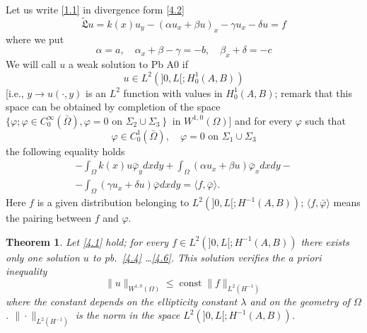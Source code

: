 \documentclass[a4paper,12pt,leqno]{article}
\newtheorem{theorem}[proposition]{Theorem}
\numberwithin{equation}{section}
\begin{document}
Let us write \cref{1.1} in divergence form \eqref{4.2}
\begin{equation} \label{4.2}
	\tilde{\mathfrak{L}} u=k(x) u_{y}-\left(\alpha u_{x}+\beta u\right)_{x}-\gamma u_{x}-\delta {u}=f
\end{equation}
where we put
\begin{equation} \label{4.3}
	\alpha=a, \quad \alpha_{x}+\beta-\gamma=-b, \quad \beta_{x}+\delta=-c
\end{equation}
We will call $u$ a weak solution to Pb A0 if
\begin{equation} \label{4.4}
	u \in L^{2}(] 0, L[; H_{0}^{1}(A, B))
\end{equation}
[i.e., $y \rightarrow u(\cdot, y)$ is an $L^{2}$ function with values in $H_{0}^{1}(A, B)$; remark that this space can be obtained by completion of the space $\{\varphi; \varphi \in C_{0}^{\infty}(\bar{\Omega}), \varphi=0 \text{ on } \left.\Sigma_{2} \cup \Sigma_{3}\right\}$ in $W^{1,0}(\Omega)$] and for every $\varphi$ such that
\begin{equation} \label{4.5}
	\varphi \in C_{0}^{1}(\bar{\Omega}), \quad \varphi=0 \text { on } \Sigma_{1} \cup \Sigma_{3}
\end{equation}
the following equality holds
\begin{equation} \label{4.6}
	\begin{split}
		-\int_{\Omega} k(x) u \bar{\varphi}_{y} d x d y+\int_{\Omega}\left(\alpha u_{x}+\beta u\right) \bar{\varphi}_{x} d x d y- \\
		-\int_{\Omega}\left(\gamma u_{x}+\delta u\right) \bar{\varphi} d x d y=\langle f, \bar{\varphi}\rangle.
	\end{split}
\end{equation}
Here $f$ is a given distribution belonging to $L^{2}(] 0, L [; H^{-1}(A, B))$; $\langle f, \bar{\varphi}\rangle$ means the pairing between $f$ and $\varphi$.

\begin{theorem} \label{TH:4.1}
	Let \eqref{4.1} hold; for every $f \in L^{2}(] 0, L[; H^{-1}(A, B))$ there exists only one solution $u$ to pb.\ \eqref{4.4} \ldots \eqref{4.6}. This solution verifies the a priori inequality
	\begin{equation} \label{4.7}
		\|u\|_{W^{1,0}(\Omega)} \leqslant \operatorname{const} \|f\|_{L^{2}\left(H^{-1}\right)}
	\end{equation}
	where the constant depends on the ellipticity constant $\lambda$ and on the geometry of $\Omega$. $\|\cdot\|_{L^2(H^{-1})}$ is the norm in the space $L^{2}(] 0, L [; H^{-1}(A, B))$.
\end{theorem}
\end{document}
